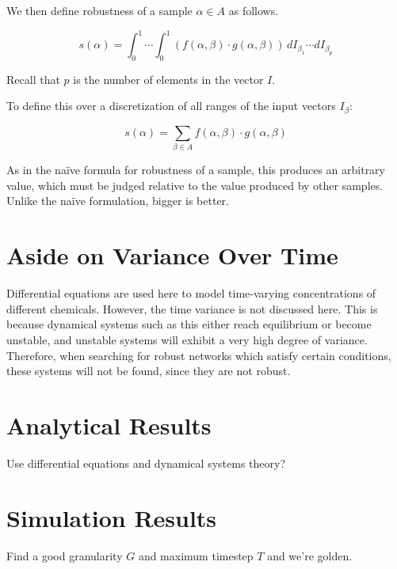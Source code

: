 \documentclass{article}
\begin{document}
We then define robustness of a sample $\alpha \in A$ as follows.

\begin{equation}
  s(\alpha) = \int_0^1 \cdots \int_0^1 (f(\alpha, \beta) \cdot g(\alpha, \beta)) \,dI_{\beta_1} \cdots dI_{\beta_p}
\end{equation}

Recall that $p$ is the number of elements in the vector $I$.

To define this over a discretization of all ranges of the input vectors $I_\beta$:

\begin{equation}
  s(\alpha) = \sum_{\beta \in A}{f(\alpha, \beta) \cdot g(\alpha, \beta)}
\end{equation}

As in the na\"ive formula for robustness of a sample, this produces an arbitrary value, which must be judged relative to the value produced by other samples. Unlike the na\"ive formulation, bigger is better.

\section{Aside on Variance Over Time}

Differential equations are used here to model time-varying concentrations of different chemicals. However, the time variance is not discussed here. This is because dynamical systems such as this either reach equilibrium or become unstable, and unstable systems will exhibit a very high degree of variance. Therefore, when searching for robust networks which satisfy certain conditions, these systems will not be found, since they are not robust.

\section{Analytical Results}
Use differential equations and dynamical systems theory?

\section{Simulation Results}
Find a good granularity $G$ and maximum timestep $T$ and we're golden.



\end{document}
